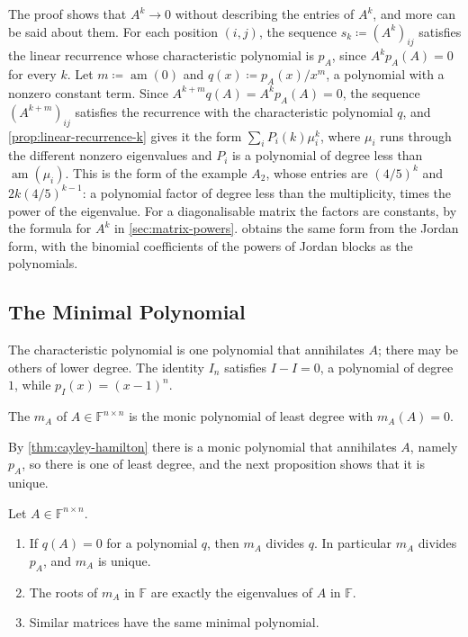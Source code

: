 The proof shows that $A^k\to0$ without describing the entries of $A^k$, and more can be said about them. For each position $(i,j)$, the sequence $s_k\coloneqq(A^k)_{ij}$ satisfies the linear recurrence whose characteristic polynomial is $p_A$, since $A^kp_A(A)=0$ for every $k$. Let $m\coloneqq\operatorname{am}(0)$ and $q(x)\coloneqq p_A(x)/x^m$, a polynomial with a nonzero constant term. Since $A^{k+m}q(A)=A^kp_A(A)=0$, the sequence $(A^{k+m})_{ij}$ satisfies the recurrence with the characteristic polynomial $q$, and \cref{prop:linear-recurrence-k} gives it the form $\sum_iP_i(k)\mu_i^k$, where $\mu_i$ runs through the different nonzero eigenvalues and $P_i$ is a polynomial of degree less than $\operatorname{am}(\mu_i)$. This is the form of the example $A_2$, whose entries are $(4/5)^k$ and $2k(4/5)^{k-1}$: a polynomial factor of degree less than the multiplicity, times the power of the eigenvalue. For a diagonalisable matrix the factors are constants, by the formula for $A^k$ in \cref{sec:matrix-powers}.  obtains the same form from the Jordan form, with the binomial coefficients of the powers of Jordan blocks as the polynomials.

\subsection{The Minimal Polynomial}

The characteristic polynomial is one polynomial that annihilates $A$; there may be others of lower degree. The identity $I_n$ satisfies $I-I=0$, a polynomial of degree $1$, while $p_I(x)=(x-1)^n$.

\begin{definition}
\label{def:minimal-polynomial}
The  $m_A$ of $A\in\mathbb F^{n\times n}$ is the monic polynomial of least degree with $m_A(A)=0$.
\end{definition}

By \cref{thm:cayley-hamilton} there is a monic polynomial that annihilates $A$, namely $p_A$, so there is one of least degree, and the next proposition shows that it is unique.

\begin{proposition}
\label{prop:minimal-polynomial}
Let $A\in\mathbb F^{n\times n}$.
\begin{enumerate}
\item If $q(A)=0$ for a polynomial $q$, then $m_A$ divides $q$. In particular $m_A$ divides $p_A$, and $m_A$ is unique.
\item The roots of $m_A$ in $\mathbb F$ are exactly the eigenvalues of $A$ in $\mathbb F$.
\item Similar matrices have the same minimal polynomial.
\end{enumerate}
\end{proposition}

